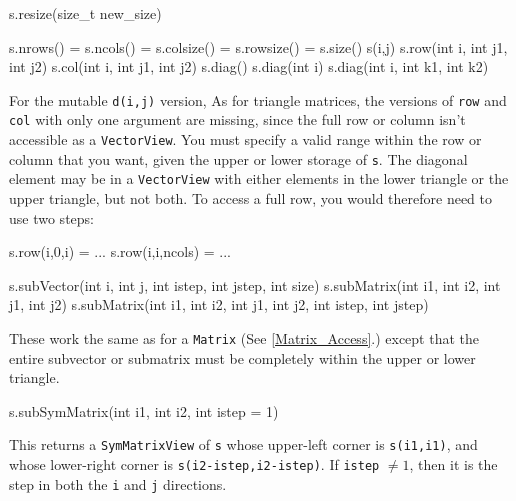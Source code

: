 \documentclass[twoside,letterpaper,11pt]{article}
\renewcommand{\tt}[1]{{\lstinline {#1}}}
\begin{document}
\begin{tmvcode}
s.resize(size_t new_size)
\end{tmvcode}

\begin{tmvcode}
s.nrows() = s.ncols() = s.colsize() = s.rowsize() = s.size()
s(i,j)
s.row(int i, int j1, int j2)
s.col(int i, int j1, int j2)
s.diag()
s.diag(int i)
s.diag(int i, int k1, int k2)
\end{tmvcode}
For the mutable \tt{d(i,j)} version, 
As for triangle matrices, the versions of \tt{row} and \tt{col} with only one argument are
missing, since the full row or column isn't accessible as a \tt{VectorView}.
You must specify a valid range within the row or column that you want, 
given the upper or lower storage of \tt{s}.
The diagonal element may be in a \tt{VectorView} with either elements in the 
lower triangle or the upper triangle, but not both.  To access a full row, you would 
therefore need to use two steps:
\begin{tmvcode}
s.row(i,0,i) = ...
s.row(i,i,ncols) = ...
\end{tmvcode}

\begin{tmvcode}
s.subVector(int i, int j, int istep, int jstep, int size)
s.subMatrix(int i1, int i2, int j1, int j2)
s.subMatrix(int i1, int i2, int j1, int j2, int istep, int jstep)
\end{tmvcode}
These work the same as for a \tt{Matrix}
(See \ref{Matrix_Access}.)
except that the entire
subvector or submatrix must be completely within the upper or lower triangle.

\begin{tmvcode}
s.subSymMatrix(int i1, int i2, int istep = 1)
\end{tmvcode}
This returns a \tt{SymMatrixView} of \tt{s} whose upper-left
corner is \tt{s(i1,i1)}, and whose lower-right corner is 
\tt{s(i2-istep,i2-istep)}.  If \tt{istep} $\neq 1$, then it is the 
step in both the \tt{i} and \tt{j} directions.
\end{document}
